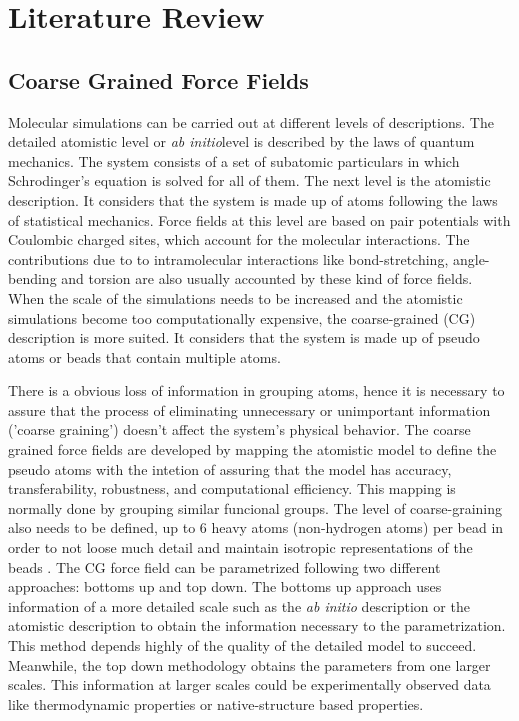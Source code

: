 
\chapter{Literature Review} %

\label{Chapter2} %


\section{Coarse Grained Force Fields}

Molecular simulations can be carried out at different levels of descriptions. The detailed atomistic level or \textit{ab initio}level is described by the laws of quantum mechanics. The system consists of a set of subatomic particulars in which Schrodinger's equation is solved for all of them. The next level is the atomistic description. It considers that the system is made up of atoms following the laws of statistical mechanics.  Force fields at this level are based on pair potentials with Coulombic charged sites, which account for the molecular interactions. The contributions due to to intramolecular interactions like bond-stretching, angle-bending and torsion are also usually accounted by these kind of force fields. When the scale of the simulations needs to be increased and the atomistic simulations become too computationally expensive, the coarse-grained (CG) description is more suited. It considers that the system is made up of pseudo atoms or beads that contain multiple atoms. 

There is a obvious loss of information in grouping atoms, hence it is necessary to assure that the process of eliminating unnecessary or unimportant information ('coarse graining') doesn't affect the system's physical behavior. The coarse grained force fields are developed by mapping the atomistic model to define the pseudo atoms with the intetion of assuring that the model has accuracy, transferability, robustness, and computational efficiency. This mapping is normally done by grouping similar funcional groups. The level of coarse-graining also needs to be defined, up to 6 heavy atoms (non-hydrogen atoms) per bead in order to not loose much detail and maintain isotropic representations of the beads \cite{shinoda2007,martini2007,hadley2012}. The CG force field can be parametrized following two different approaches: bottoms up and top down. The bottoms up approach uses information of a more detailed scale such as the \textit{ab initio} description or the atomistic description to obtain the information necessary to the parametrization. This method depends highly of the quality of the detailed model to succeed. Meanwhile, the top down methodology obtains the parameters from one larger scales. This information at larger scales could be experimentally observed data like thermodynamic properties or native-structure based properties. 

